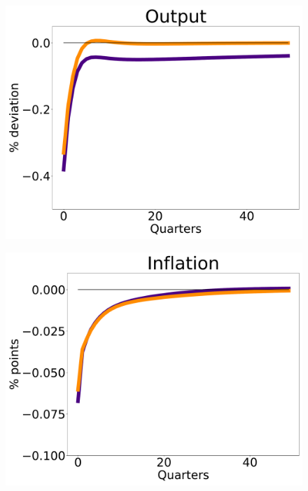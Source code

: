 \begin{figure}[htb]
\begin{minipage}{0.33\textwidth}
  \includegraphics[scale=.14]{text/Chapter1/Figures/IPRs_ev/Y_IPR_ev}
  \label{fig:3}
\end{minipage}
\begin{minipage}{0.33\textwidth}
  \includegraphics[scale=.14]{text/Chapter1/Figures/IPRs_ev/pi_IPR_ev}
  \label{fig:4}
\end{minipage}
\medskip
\begin{minipage}{0.33\textwidth}

\end{minipage}
\end{figure}
